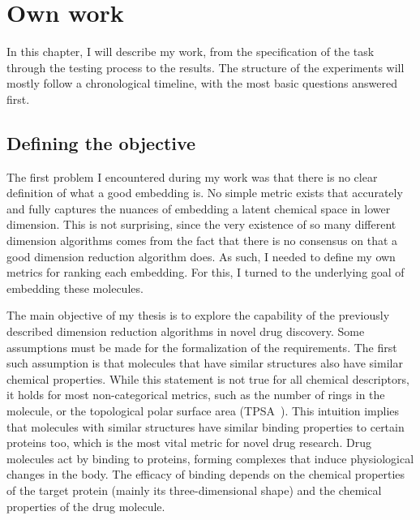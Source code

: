 \chapter{Own work}\label{ch:own-work}

In this chapter, I will describe my work, from the specification of the task through the testing process to the results. The structure of the experiments will mostly follow a chronological timeline, with the most basic questions answered first.

\section{Defining the objective}\label{sec:defining-the-objective}

The first problem I encountered during my work was that there is no clear definition of what a good embedding is. No simple metric exists that accurately and fully captures the nuances of embedding a latent chemical space in lower dimension. This is not surprising, since the very existence of so many different dimension algorithms comes from the fact that there is no consensus on that a good dimension reduction algorithm does. As such, I needed to define my own metrics for ranking each embedding. For this, I turned to the underlying goal of embedding these molecules.

The main objective of my thesis is to explore the capability of the previously described dimension reduction algorithms in novel drug discovery. Some assumptions must be made for the formalization of the requirements. The first such assumption is that molecules that have similar structures also have similar chemical properties. While this statement is not true for all chemical descriptors, it holds for most non-categorical metrics, such as the number of rings in the molecule, or the topological polar surface area (TPSA~\cite{bib:tpsa}). This intuition implies that molecules with similar structures have similar binding properties to certain proteins too, which is the most vital metric for novel drug research. Drug molecules act by binding to proteins, forming complexes that induce physiological changes in the body. The efficacy of binding depends on the chemical properties of the target protein (mainly its three-dimensional shape) and the chemical properties of the drug molecule.

